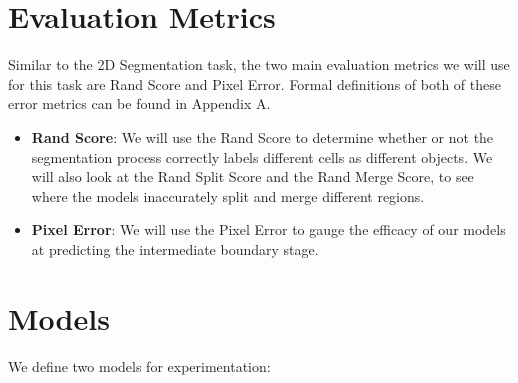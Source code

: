 \section{Evaluation Metrics}

Similar to the 2D Segmentation task, the two main evaluation metrics we will use for this task are Rand Score and Pixel Error. Formal definitions of both of these error metrics can be found in Appendix A. 

\begin{itemize}
\item \textbf{Rand Score}: We will use the Rand Score to determine whether or not the segmentation process correctly labels different cells as different objects. We will also look at the Rand Split Score and the Rand Merge Score, to see where the models inaccurately split and merge different regions.
\item \textbf{Pixel Error}: We will use the Pixel Error to gauge the efficacy of our models at predicting the intermediate boundary stage.
\end{itemize}

\section{Models}

We define two models for experimentation:

